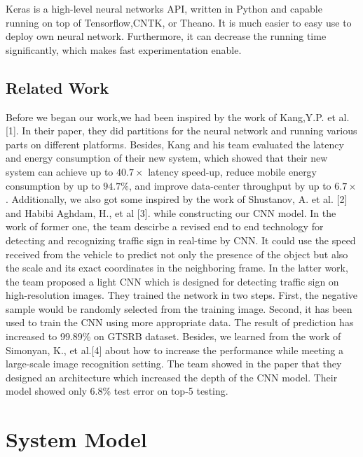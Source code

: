 \documentclass[conference]{IEEEtran}
\begin{document}
Keras is a high-level neural networks API, written in Python and capable running on top of Tensorflow,CNTK, or Theano. It is much easier to easy use to deploy own neural network. Furthermore, it can decrease the running time significantly, which makes fast experimentation enable. 

\subsection{Related Work}

Before we began our work,we had been inspired by the work of Kang,Y.P. et al. [1]. In their paper, they did partitions for the neural network and running various parts on different platforms. Besides, Kang and his team evaluated the latency and energy consumption of their new system, which showed that their new system can achieve up to $40.7 \times$ latency speed-up, reduce mobile energy consumption by up to $94.7 \%$, and improve data-center throughput by up to $6.7 \times$. Additionally, we also got some inspired by the work of Shustanov, A. et al. [2] and Habibi Aghdam, H., et al [3]. while constructing our CNN model. In the work of former one, the team descirbe a revised end to end technology for detecting and recognizing traffic sign in real-time by CNN. It could use the speed received from the vehicle to predict not only the presence of the object but also the scale and its exact coordinates in the neighboring frame. In the latter work, the team proposed a light CNN which is designed for detecting traffic sign on high-resolution images. They trained the network in two steps. First, the negative sample would be randomly selected from the training image. Second, it has been used to train the CNN using more appropriate data. The result of prediction has increased to 99.89\% on GTSRB dataset. Besides, we learned from the work of Simonyan, K., et al.[4] about how to increase the performance while meeting a large-scale image recognition setting. The team showed in the paper that they designed an architecture which increased the depth of the CNN model. Their model showed only 6.8\% test error on top-5 testing.   



\section{System Model}
\end{document}
